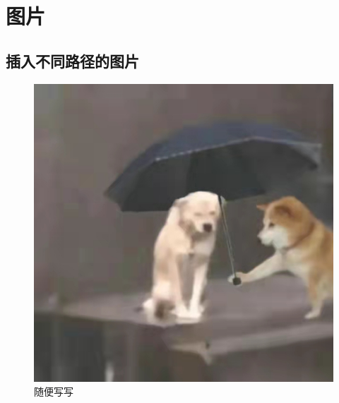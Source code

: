 \documentclass[UTF8,a4paper,10pt]{article}
\begin{document}
	 
	
	\section{图片}
	\subsection{插入不同路径的图片}
	\begin{figure} [!h] %
		\centering %
		\includegraphics[width=0.7\linewidth]{fig/1} %
		\caption{随便写写} %
	\end{figure}
\end{document}
